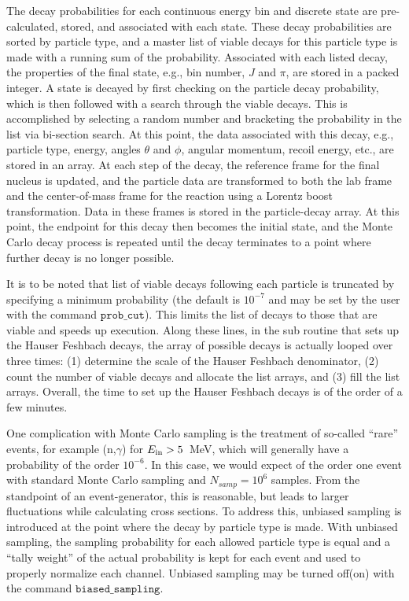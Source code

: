 \documentclass[
10pt,
showpacs,preprintnumbers,footinbib,
amsfonts,amsmath,amssymb,
aps,
prc,twocolumn,groupedaddress,superscriptaddress,
showkeys,
nofootinbib
]{revtex4-1}
\begin{document}
The decay probabilities for each continuous energy bin and discrete state are pre-calculated, stored, and associated with each state. These decay probabilities are sorted by particle type, and a master list of viable decays for this particle type is made with a running sum of the probability. Associated with each listed decay, the properties of the final state, e.g., bin number, $J$ and $\pi$, are stored in a packed integer. A state is decayed by first checking on the particle decay probability, which is then followed with a search through the viable decays. This is accomplished by selecting a random number and bracketing the probability in the list via bi-section search. At this point, the data associated with this decay, e.g., particle type, energy, angles $\theta$ and $\phi$, angular momentum, recoil energy, etc., are stored in an array. At each step of the decay, the reference frame for the final nucleus is updated, and the particle data are transformed to both the lab frame and the center-of-mass frame for the reaction using a Lorentz boost transformation. Data in these frames is stored in the particle-decay array. At this point, the endpoint for this decay then becomes the initial state, and the Monte Carlo decay process is repeated until the decay terminates to a point where further decay is no longer possible. 

It is to be noted that list of viable decays following each particle is truncated by specifying a minimum probability (the default is $10^{-7}$ and may be set by the user with the command ${\texttt{prob\_cut}}$). This limits the list of decays to those that are viable and speeds up execution. Along these lines, in the sub routine that sets up the Hauser Feshbach decays, the array of possible decays is actually looped over three times: (1) determine the scale of the Hauser Feshbach denominator, (2) count the number of viable decays and allocate the list arrays, and (3) fill the list arrays. Overall, the time to set up the Hauser Feshbach decays is of the order of a few minutes.

One complication with Monte Carlo sampling is the treatment of so-called ``rare'' events, for example (n,$\gamma$) for $E_{\rm in} > 5$~MeV, which will generally have a probability of the order $10^{-6}$. In this case, we would expect of the order one event with standard Monte Carlo sampling and $N_{samp}=10^6$ samples. From the standpoint of an event-generator, this is reasonable, but leads to larger fluctuations while calculating cross sections. To address this, unbiased sampling is introduced at the point where the decay by particle type is made. With unbiased sampling, the sampling probability for each allowed particle type is equal and a ``tally weight'' of the actual probability is kept for each event and used to properly normalize each channel. Unbiased sampling may be turned off(on) with the command ${\texttt{biased\_sampling}}$.
\end{document}

